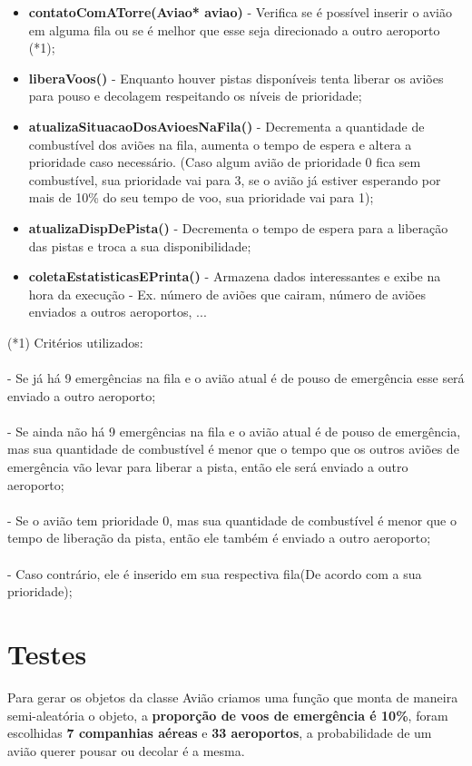 \documentclass{article}
\begin{document}
\begin{itemize}
   \item \textbf{contatoComATorre(Aviao* aviao)} - Verifica se é possível inserir o avião em alguma fila ou se
   é melhor que esse seja direcionado a outro aeroporto (*1);
   \item \textbf{liberaVoos()} - Enquanto houver pistas disponíveis tenta liberar os aviões para pouso e decolagem
   respeitando os níveis de prioridade;
   \item \textbf{atualizaSituacaoDosAvioesNaFila()} - Decrementa a quantidade de combustível dos aviões na fila, aumenta
   o tempo de espera e altera a prioridade caso necessário. (Caso algum avião de prioridade 0
   fica sem combustível, sua prioridade vai para 3, se o avião já estiver esperando por mais de 10\% do
   seu tempo de voo, sua prioridade vai para 1);
   \item \textbf{atualizaDispDePista()} - Decrementa o tempo de espera para a liberação das pistas e troca a sua
   disponibilidade;
   \item \textbf{coletaEstatisticasEPrinta()} - Armazena dados interessantes e exibe na hora da execução - Ex. número de aviões que cairam,
   número de aviões enviados a outros aeroportos, ...
\end{itemize}
(*1) Critérios utilizados:\\\\
 - Se já há 9 emergências na fila e o avião atual é de pouso de emergência esse será enviado a outro aeroporto;
\\\\
 - Se ainda não há 9 emergências na fila e o avião atual é de pouso de emergência, mas sua quantidade de combustível
 é menor que o tempo que os outros aviões de emergência vão levar para liberar a pista, então ele será
 enviado a outro aeroporto; 
\\\\
 - Se o avião tem prioridade 0, mas sua quantidade de combustível é menor que o tempo de liberação
da pista, então ele também é enviado a outro aeroporto;
\\\\
 - Caso contrário, ele é inserido em sua respectiva fila(De acordo com a sua prioridade);


\section{Testes}
Para gerar os objetos da classe Avião criamos uma função que monta de maneira semi-aleatória o objeto, a
\textbf{proporção de voos de emergência é 10\%}, foram escolhidas \textbf{7 companhias aéreas} e \textbf{33 aeroportos}, a probabilidade
de um avião querer pousar ou decolar é a mesma.
\end{document}
